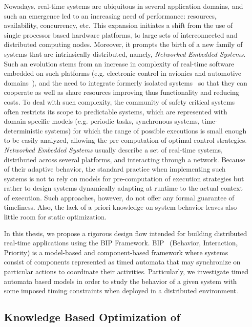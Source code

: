 Nowadays, real-time systems are ubiquitous in several application domains, 
and such an emergence led to an increasing need of performance: resources, 
availability, concurrency, etc. This expansion initiates a shift from the
use of single processor based hardware platforms, to large sets 
of interconnected and distributed computing nodes. Moreover, it prompts the birth 
of a new family of systems that are intrinsically distributed, namely, 
\emph{Networked Embedded Systems}. 
Such an evolution stems from an increase in complexity of real-time software 
embedded on such platforms (e.g. electronic control in avionics 
and automotive domains~\cite{charette09}), and the need to integrate 
formerly isolated systems~\cite{kopetz04} so that 
they can cooperate as well as share resources improving thus functionality 
and reducing costs.
To deal with such complexity, the community of safety critical systems 
often restricts its scope to predictable systems, which are represented 
with domain specific models (e.g. periodic tasks, synchronous systems, 
time-deterministic systems) for which the range of possible executions 
is small enough to be easily analyzed, allowing the pre-computation 
of optimal control strategies.
\emph{Networked Embedded Systems} usually describe a set of real-time systems, 
distributed across several platforms, and interacting through a network. 
Because of their adaptive behavior, the standard practice when implementing 
such systems is not to rely on models for pre-computation of execution strategies but rather 
to design systems dynamically adapting at runtime to the actual context of execution.
Such approaches, however, do not offer any formal guarantee of timeliness. Also, 
the lack of a priori knowledge on system behavior leaves also little room for 
static optimization.

In this thesis, we propose a rigorous design flow intended for building distributed real-time 
applications using the BIP Framework. BIP~\cite{intro:bip} (Behavior, Interaction, Priority)
is a model-based and component-based framework where systems consist of components
represented as timed automata that may synchronize on particular actions to coordinate
their activities.
Particularly, we investigate timed automata based models in order 
to study the behavior of a given system with some imposed timing constraints when deployed 
in a distributed environment. 

\subsection*{Knowledge Based Optimization of}

